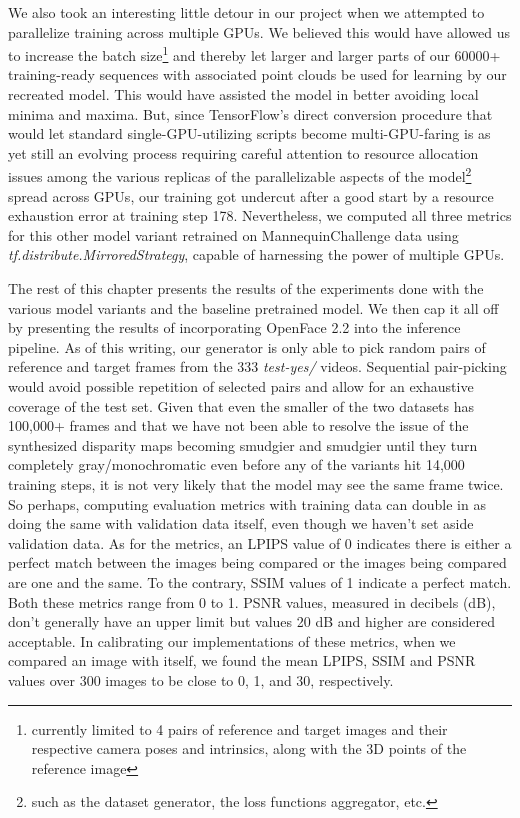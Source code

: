 We also took an interesting little detour in our project when we attempted to parallelize training across multiple GPUs. We believed this would have allowed us to increase the batch size\footnote{currently limited to 4 pairs of reference and target images and their respective camera poses and intrinsics, along with the 3D points of the reference image} and thereby let larger and larger parts of our 60000+ training-ready sequences with associated point clouds be used for learning by our recreated model. This would have assisted the model in better avoiding local minima and maxima. But, since TensorFlow's direct conversion procedure that would let standard single-GPU-utilizing scripts become multi-GPU-faring is as yet still an evolving process requiring careful attention to resource allocation issues among the various replicas of the parallelizable aspects of the model\footnote{such as the dataset generator, the loss functions aggregator, etc.} spread across GPUs, our training got undercut after a good start by a resource exhaustion error at training step 178. Nevertheless, we computed all three metrics for this other model variant retrained on MannequinChallenge data using \textit{tf.distribute.MirroredStrategy}, capable of harnessing the power of multiple GPUs.

The rest of this chapter presents the results of the experiments done with the various model variants and the baseline pretrained model. We then cap it all off by presenting the results of incorporating OpenFace 2.2 into the inference pipeline. As of this writing, our generator is only able to pick random pairs of reference and target frames from the 333 \textit{test-yes/} videos. Sequential pair-picking would avoid possible repetition of selected pairs and allow for an exhaustive coverage of the test set. Given that even the smaller of the two datasets has 100,000+ frames and that we have not been able to resolve the issue of the synthesized disparity maps becoming smudgier and smudgier until they turn completely gray/monochromatic even before any of the variants hit 14,000 training steps, it is not very likely that the model may see the same frame twice. So perhaps, computing evaluation metrics with training data can double in as doing the same with validation data itself, even though we haven't set aside validation data. As for the metrics, an LPIPS value of 0 indicates there is either a perfect match between the images being compared or the images being compared are one and the same. To the contrary, SSIM values of 1 indicate a perfect match. Both these metrics range from 0 to 1. PSNR values, measured in decibels (dB), don't generally have an upper limit but values 20 dB and higher are considered acceptable. In calibrating our implementations of these metrics, when we compared an image with itself, we found the mean LPIPS, SSIM and PSNR values over 300 images to be close to 0, 1, and 30, respectively.

